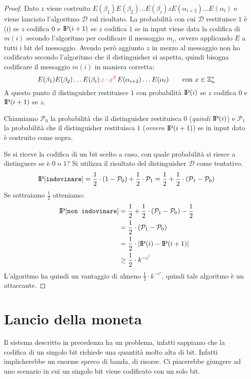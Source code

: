 \begin{proof}
Dato $z$ viene costruito $E(\beta_1)E(\beta_2)\dots E(\beta_i)zE(\alpha_{i+2})\dots E(\alpha_l)$ e viene lanciato 
l'algoritmo $\mathcal{D}$ sul risultato. La probabilità con cui $\mathcal{D}$ restituisce $1$ è \probP(i) se $z$
codifica $0$ e $\text{I\kern-0.15em P}(i+1)$ se $z$ codifica $1$ se in input viene data la codifica di $m(i)$ secondo 
l'algoritmo per codificare il messaggio $m_i$, ovvero applicando $E$ a tutti i bit del messaggio.
Avendo però aggiunto $z$ in mezzo al messaggio non ho codificato secondo l'algoritmo che il distinguisher
si aspetta, quindi bisogna codificare il messaggio $m(i)$ in maniera corretta:
\[
  E(\beta_1)E(\beta_2)\dots E(\beta_i)\,\textcolor{red}{z \cdot x^2}\,E(\alpha_{i+2})\dots E(\alpha_l)\qquad \text{con } 
  x \in \mathbb{Z}_n^*
\]
A questo punto il distinguisher restituisce $1$ con probabilità $\text{I\kern-0.15em P}(i)$ se $z$
codifica $0$ e $\text{I\kern-0.15em P}(i+1)$ se $z$.

Chiamiamo $\mathcal{P}_0$ la probabilità che il distinguisher restituisca $0$ (\textit{quindi $\text{I\kern-0.15em P}(i)$}) e 
$\mathcal{P}_1$ la probabilità che il distinguisher restituisca $1$ (\textit{ovvero $\text{I\kern-0.15em P}(i+1)$}) se in input dato è costruito come sopra.

Se si riceve la codifica di un bit scelto a caso, con quale probabilità si riesce a distinguere se è $0$ o $1$?
Si utilizza il risultato del distinguisher $\mathcal{D}$ come tentativo.
\[
  \text{I\kern-0.15em P}[\texttt{indovinare}] = \frac{1}{2} \cdot (1 - \mathcal{P}_0) + \frac{1}{2} \cdot \mathcal{P}_1 = 
  \frac{1}{2} + \frac{1}{2} \cdot (\mathcal{P}_1 - \mathcal{P}_0)
\]
Se sottraiamo $\frac{1}{2}$ otteniamo:
  \begin{align*}
    \text{I\kern-0.15em P}[\texttt{non indovinare}] &= \frac{1}{2} + \frac{1}{2} \cdot (\mathcal{P}_1 -
  \mathcal{P}_0) - \frac{1}{2} \\
  &= \frac{1}{2} \cdot (\mathcal{P}_1 - \mathcal{P}_0) \\
  &= \frac{1}{2} \cdot |\text{I\kern-0.15em P}(i) - \text{I\kern-0.15em P}(i+1)| \\
  &\geq \frac{1}{2} \cdot k^{-c'}
  \end{align*}
L'algoritmo ha quindi un vantaggio di almeno $\frac{1}{2} \cdot k^{-c'}$, quindi tale algoritmo è 
un attaccante.
\end{proof}
\section{Lancio della moneta}
Il sistema descritto in precedenza ha un problema, infatti sappiamo che 
la codifica di un singolo bit richiede una quantità molto alta di bit. Infatti 
implicherebbe un enorme spreco di banda, di risorse. Ci piacerebbe giungere 
ad uno scenario in cui un singolo bit viene codificato con un solo bit.

